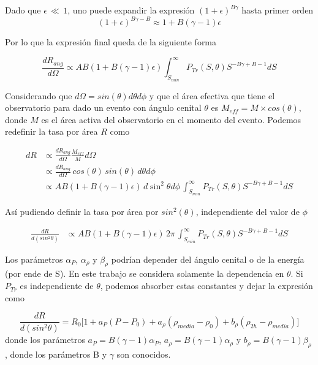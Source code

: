 Dado que $\epsilon\,\ll\,1$, uno puede expandir la expresión $(1+\epsilon)^{B\gamma}$ hasta primer orden 
\begin{equation*}
	(1+\epsilon)^{B\gamma-B} \approx 1 + B(\gamma-1)\epsilon
\end{equation*}

Por lo que la expresión final queda de la siguiente forma

\begin{equation*}
	\frac{dR_{ang}}{d\Omega} \propto AB(1+B(\gamma - 1)\epsilon)\int_{S_{min}}^{\infty} P_{Tr}(S,\theta) S^{-B\gamma +B -1} dS
\end{equation*}

Considerando que $d\Omega= sin(\theta)d\theta d\phi$ y que el área efectiva  que tiene el observatorio para dado un evento con ángulo cenital $\theta$ es $M_{eff}=M\times cos(\theta)$, donde $M$ es el área activa del observatorio en el momento del evento. Podemos redefinir la tasa por área $R$ como

\begin{align*}
	dR 	&\propto \frac{dR_{ang}}{d\Omega} \frac{M_{eff}}{M} d\Omega \\
		&\propto \frac{dR_{ang}}{d\Omega}\, cos(\theta)\, sin(\theta)\,d\theta d\phi\\
		&\propto  AB(1+B(\gamma - 1)\epsilon)\,d\sin^2\theta d\phi\,\int_{S_{min}}^{\infty} P_{Tr}(S,\theta) S^{-B\gamma +B -1} dS
\end{align*}

Así pudiendo definir la tasa por área por $sin^2(\theta)$, independiente del valor de $\phi$

\begin{align*}
	\frac{dR}{d(sin^2\theta)} &\propto AB(1+B(\gamma-1)\epsilon)\, 2\pi \,\int_{S_{min}}^{\infty} P_{Tr}(S,\theta) S^{-B\gamma +B -1} dS
\end{align*}

Los parámetros $\alpha_P$, $\alpha_{\rho}$ y $\beta_{\rho}$ podrían depender del ángulo cenital o de la energía (por ende de S). En este trabajo se considera solamente la dependencia en $\theta$. Si $P_{Tr}$ es independiente de $\theta$, podemos absorber estas constantes y dejar la expresión como

\begin{equation}
	\frac{dR}{d(sin^2\theta)} = R_0\bigg[1+a_P(P-P_0) +a_{\rho}(\rho_{media}-\rho_0) + b_{\rho}(\rho_{2h}-\rho_{media})\bigg] 
	\label{eq:rate_sin2}
\end{equation}
donde los parámetros $a_P=B(\gamma-1)\alpha_{P}$, $a_{\rho}=B(\gamma-1)\alpha_{\rho}$ y $b_{\rho}=B(\gamma-1)\beta_{\rho}$, donde los parámetros B y $\gamma$ son conocidos.

